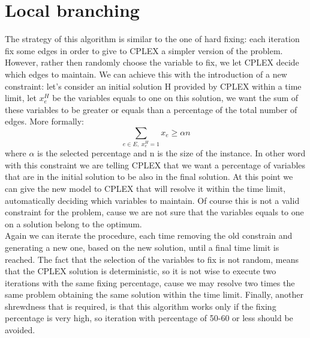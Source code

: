 \section{Local branching}
The strategy of this algorithm is similar to the one of hard fixing: each iteration fix some edges in order to give to CPLEX a simpler version of the problem. However, rather then randomly choose the variable to fix, we let CPLEX decide which edges to maintain. We can achieve this with the introduction of a new constraint: let's consider an initial solution H provided by CPLEX within a time limit, let $x_e^H$ be the variables equals to one on this solution, we want the sum of these variables to be greater or equals than a percentage of the total number of edges. More formally:
\begin{equation*}
	\sum_{e \in E, \; x_e^H = 1} x_e \geq \alpha n
\end{equation*}
where $\alpha$ is the selected percentage and n is the size of the instance. In other word with this constraint we are telling CPLEX that we want a percentage of variables that are in the initial solution to be also in the final solution. At this point we can give the new model to CPLEX that will resolve it within the time limit, automatically deciding which variables to maintain.
Of course this is not a valid constraint for the problem, cause we are not sure that the variables equals to one on a solution belong to the optimum.\\
Again we can iterate the procedure, each time removing the old constrain and generating a new one, based on the new solution, until a final time limit is reached. The fact that the selection of the variables to fix is not random, means that the CPLEX solution is deterministic, so it is not wise to execute two iterations with the same fixing percentage, cause we may resolve two times the same problem obtaining the same solution within the time limit.
Finally, another shrewdness that is required, is that this algorithm works only if the fixing percentage is very high, so iteration with percentage of 50-60 or less should be avoided.


